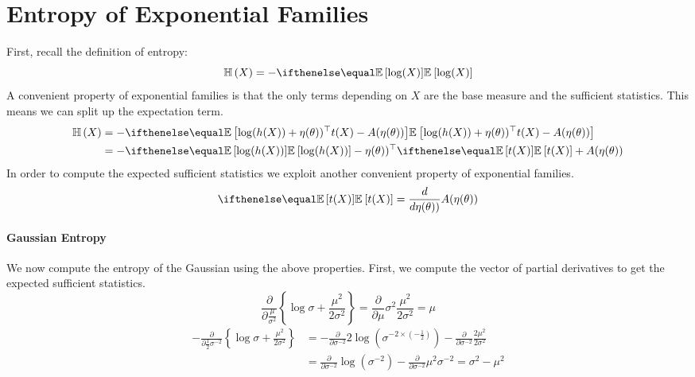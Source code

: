 \documentclass[a4paper, 11pt]{article}
\begin{document}
\section{Entropy of Exponential Families}

First, recall the definition of entropy:
\begin{equation}
\Ent{X} = -\E{\log(X)}
\end{equation}
A convenient property of exponential families is that the only terms depending on $ X $ are the base measure and the sufficient
statistics. This means we can split up the expectation term.
\begin{subequations}
\begin{align}
\Ent{X} &= -\E{\log(h(X)) + \eta(\theta))^{\top} t(X) - A(\eta(\theta))} \\
&=- \E{\log(h(X))} - \eta(\theta))^{\top} \E{t(X)} + A(\eta(\theta)) \label{eq:expFamEntropy}
\end{align}
\end{subequations}
In order to compute the expected sufficient statistics we exploit another convenient property
of exponential families.
\begin{equation}
\E{t(X)} = \frac{d}{d\eta(\theta))}A(\eta(\theta))
\end{equation}

\paragraph{Gaussian Entropy} We now compute the entropy of the Gaussian using the above properties. First, we compute the vector
of partial derivatives to get the expected sufficient statistics.
\begin{equation}
\frac{\partial}{\partial \frac{\mu}{\sigma^{2}}} \left\{ \log \sigma + \frac{\mu^{2}}{2\sigma^{2}} \right\} = 
\frac{\partial}{\partial \mu} \sigma^{2} \frac{\mu^{2}}{2\sigma^{2}} = \mu
\end{equation}
\begin{subequations}
\begin{align}
-\frac{\partial}{\partial \frac{1}{2}\sigma^{-2}} \left\{ \log \sigma + \frac{\mu^{2}}{2\sigma^{2}} \right\} &=
-\frac{\partial}{\partial \sigma^{-2}} 2\log \left(\sigma^{-2\times \left(-\frac{1}{2}\right)} \right) - \frac{\partial}{\partial \sigma^{-2}} \frac{2\mu^{2}}{2\sigma^{2}} \\
&=\frac{\partial}{\partial \sigma^{-2}} \log \left(\sigma^{-2} \right) - \frac{\partial}{\partial \sigma^{-2}} \mu^{2}\sigma^{-2} =  \sigma^{2} - \mu^{2}
\end{align}
\end{subequations}
\end{document}
